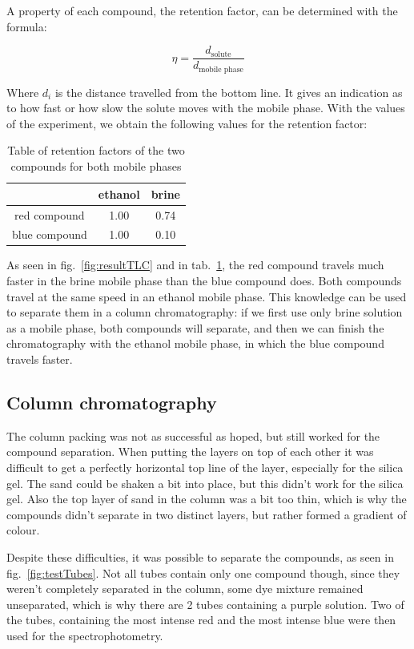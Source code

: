 \documentclass{article}
\begin{document}
A property of each compound, the retention factor, can be determined with the formula:

\begin{equation}
    \eta = \frac{d_{\text{solute}}}{d_{\text{mobile phase}}}
\end{equation}

Where $d_i$ is the distance travelled from the bottom line. It gives an indication as to how fast or how slow the solute moves with the mobile phase. With the values of the experiment, we obtain the following values for the retention factor:

\begin{table}[!ht]
    \centering
    \begin{tabular}{c|c|c}
         & ethanol & brine \\ \hline
        red compound & 1.00 & 0.74 \\
        blue compound & 1.00 & 0.10
    \end{tabular}
    \caption{Table of retention factors of the two compounds for both mobile phases}
    \label{tab:retentionFactor}
\end{table}

As seen in fig.~\ref{fig:resultTLC} and in tab.~\ref{tab:retentionFactor}, the red compound travels much faster in the brine mobile phase than the blue compound does. Both compounds travel at the same speed in an ethanol mobile phase. This knowledge can be used to separate them in a column chromatography: if we first use only brine solution as a mobile phase, both compounds will separate, and then we can finish the chromatography with the ethanol mobile phase, in which the blue compound travels faster.

\subsection{Column chromatography}
The column packing was not as successful as hoped, but still worked for the compound separation. When putting the layers on top of each other it was difficult to get a perfectly horizontal top line of the layer, especially for the silica gel. The sand could be shaken a bit into place, but this didn't work for the silica gel. Also the top layer of sand in the column was a bit too thin, which is why the compounds didn't separate in two distinct layers, but rather formed a gradient of colour.

Despite these difficulties, it was possible to separate the compounds, as seen in fig.~\ref{fig:testTubes}. Not all tubes contain only one compound though, since they weren't completely separated in the column, some dye mixture remained unseparated, which is why there are 2 tubes containing a purple solution. Two of the tubes, containing the most intense red and the most intense blue were then used for the spectrophotometry.  
\end{document}
